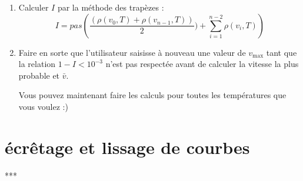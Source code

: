 \documentclass[12pt,a4paper]{report}
\begin{document}
\begin{enumerate}
Appliquée à la méthodes des trapèzes, on a dans le cas qui nous intéresse :

$$ \bar{v}={pas}\left(\dfrac{\left(v_0\rho(v_0,T) +v_{n-1}\rho(v_{n-1},T)\right) }{2} )+\sum_{i=1}^{n-2}v_i\rho(v_i,T)\right)$$

Vous remarquerez que la vitesse la vitesse moyenne n'est pas la plus probable !.

\textbf{AMÉLIORATIONS FACULTATIVES} (demander à l'enseignant si vous avez le temps de la traiter en séance ou s'il vaut mieux passer à l'exercice suivant) : Si vous avez réussi les questions précédentes, C'est que le sujet a été écrit pour vous faciliter la tâche. On vous a fixé les données suivantes : la température et la vitesse maximale $v_{\mathrm{max}}$. Mais si vous choisissez une température plus élevée qui vous garantit qu'un nombre important d'atomes ne vont pas dépasser les \SI{1500}{\meter\per\second} ? Il faut donc vérifier avant les calculs de la vitesse la plus probable et de $ \bar{v}$ que l'ensemble des vitesses choisies est suffisant. S'il n'est pas suffisant il faudra alors demander à l'utilisateur de choisir une valeur $v_{\mathrm{max}}$ supérieure à celle choisie précédemment. Mais comment savoir si $v_{\mathrm{max}}$ est suffisamment grande ? Pour cela, il faut s'assurer que l'intégrale
$ I=\int_0^{v_{\mathrm{max}}}\rho(v,T)dv$ est proche de 1. Par exemple, on peut considérer que si $1-I<10^{-3}$, la plage de vitesses est suffisante. Sinon, cela signifie que la valeur saisie pour  $v_{\mathrm{max}}$ est trop faible et qu'il faut demander une valeur plus importante et ainsi de suite jusqu'à ce que $I$ vérifie $1-I<10^{-3}$. Les questions suivantes portent sur l'implémentation de ce processus.

\item Calculer $I$ par la méthode des trapèzes :
$$ I={pas}\left(\dfrac{\left(\rho(v_0,T) +\rho(v_{n-1},T)\right) }{2} )+\sum_{i=1}^{n-2}\rho(v_i,T)\right)$$

\item Faire en sorte que l'utilisateur saisisse à nouveau une valeur de $v_{\mathrm{max}}$ tant que la relation $1-I<10^{-3}$ n'est pas respectée avant de calculer la vitesse la plus probable et $ \bar{v}$.

Vous pouvez maintenant faire les calculs pour toutes les températures que vous voulez :)
	
\end{enumerate}

\section{écrêtage et lissage de courbes} ***
\end{document}
